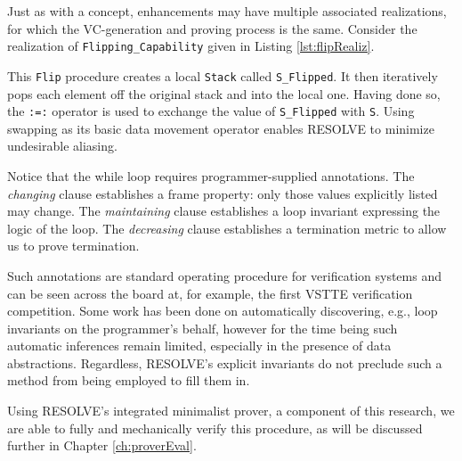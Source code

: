 \mbox{}

Just as with a concept, enhancements may have multiple associated realizations, for which the VC-generation and proving process is the same.  Consider the realization of \texttt{Flipping\_Capability} given in Listing \ref{lst:flipRealiz}.



This \texttt{Flip} procedure creates a local \texttt{Stack} called \texttt{S\_Flipped}.  It then iteratively pops each element off the original stack and into the local one.  Having done so, the \texttt{:=:} operator is used to exchange the value of \texttt{S\_Flipped} with \texttt{S}.  Using swapping as its basic data movement operator enables RESOLVE to minimize undesirable aliasing\cite{harmsSwapping}.

Notice that the while loop requires programmer-supplied annotations.  The \emph{changing} clause establishes a frame property: only those values explicitly listed may change.  The \emph{maintaining} clause establishes a loop invariant expressing the logic of the loop.  The \emph{decreasing} clause establishes a termination metric to allow us to prove termination.

Such annotations are standard operating procedure for verification systems and can be seen across the board at, for example, the first VSTTE verification competition\cite{klebanovVSTTEExperience}.  Some work has been done on automatically discovering, e.g., loop invariants on the programmer's behalf\cite{ernstInfer}, however for the time being such automatic inferences remain limited, especially in the presence of data abstractions.  Regardless, RESOLVE's explicit invariants do not preclude such a method from being employed to fill them in.

Using RESOLVE's integrated minimalist prover, a component of this research, we are able to fully and mechanically verify this procedure, as will be discussed further in Chapter \ref{ch:proverEval}.
